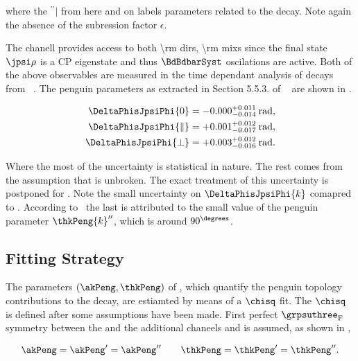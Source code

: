 \noindent where the ${}^{\prime\prime}|$ from here and on labels parameters related to the \BdJpsiRho decay.
Note again the absence of the subression factor $\epsilon$.

The \BdJpsiRho chanell provides access to both \Acp{\rm dir}, \Acp{\rm mix} since the final state $\jpsi\rho$ is
a CP eigenstate and thus $\BdBdbarSyst$ oscilations are active. Both of the above observables are measured in the
time dependant analysis of \BdJpsipipi decays from \lhcb~\cite{Aaij:2014vda}. The penguin parameters as extracted
in Section 5.5.3. of ~\cite{DeBruyn-thesis} are shown in .

\begin{subequations}
  \label{delta_phis_jpsirho}
  \begin{align}
    \DeltaPhisJpsiPhi{0}         & = -0.000^{+0.011}_{-0.014}\:\text{rad},\\
    \DeltaPhisJpsiPhi{\parallel} & = +0.001^{+0.012}_{-0.017}\:\text{rad},\\
    \DeltaPhisJpsiPhi{\perp}     & = +0.003^{+0.012}_{-0.016}\:\text{rad}.
  \end{align}
\end{subequations}

\noindent Where the most of the uncertainty is statistical in nature. The rest comes from the assumption that \grpsuthree is
unbroken. The exact treatment of this uncertainty is postponed for . Note the small uncertainty on
$\DeltaPhisJpsiPhi{k}$ comapred to . According to~\cite{DeBruyn-thesis} the last is attributed
to the small value of the penguin parameter $\thkPeng{k}''$, which is around $90^{\degrees}$.

\subsection{Fitting Strategy}
\label{penguin_chi2_fit}

The parameters $(\akPeng,\thkPeng)$ of , which quantify the penguin topology contributions
to the \BsJpsiPhi decay, are estiamted by means of a $\chisq$ fit. The $\chisq$ is defined after some assumptions have
been made. First perfect $\grpsuthree_{\rm F}$ symmetry between the \BsJpsiPhi and the additional chaneels \BsJpsiKst
and \BdJpsiRho is assumed, as shown in ,

\begin{equation}
\akPeng= \akPeng' = \akPeng'' \qquad \thkPeng = \thkPeng' = \thkPeng''.
\label{su3_apply}
\end{equation}

